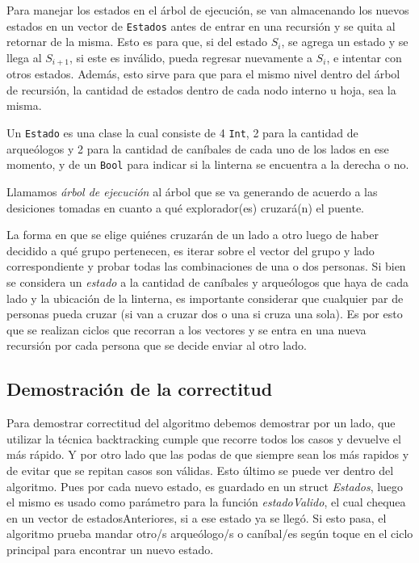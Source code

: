             Para manejar los estados en el árbol de ejecución, se van almacenando los nuevos estados en un vector de \texttt{Estados} antes de entrar en una recursión y se quita al retornar de la misma. Esto es para que, si del estado $S_{i}$, se agrega un estado y se llega al $S_{i+1}$, si este es inválido, pueda regresar nuevamente a $S_{i}$, e intentar con otros estados. Además, esto sirve para que para el mismo nivel dentro del árbol de recursión, la cantidad de estados dentro de cada nodo interno u hoja, sea la misma.

            Un \texttt{Estado} es una clase la cual consiste de 4 \texttt{Int}, 2 para la cantidad de arqueólogos y 2 para la cantidad de caníbales de cada uno de los lados en ese momento, y de un \texttt{Bool} para indicar si la linterna se encuentra a la derecha o no.

            Llamamos \emph{árbol de ejecución} al árbol que se va generando de acuerdo a las desiciones tomadas en cuanto a qué explorador(es) cruzará(n) el puente.

            La forma en que se elige quiénes cruzarán de un lado a otro luego de haber decidido a qué grupo pertenecen, es iterar sobre el vector del grupo y lado correspondiente y probar todas las combinaciones de una o dos personas. Si bien se considera un \emph{estado} a la cantidad de caníbales y arqueólogos que haya de cada lado y la ubicación de la linterna, es importante considerar que cualquier par de personas pueda cruzar (si van a cruzar dos o una si cruza una sola). Es por esto que se realizan ciclos que recorran a los vectores y se entra en una nueva recursión por cada persona que se decide enviar al otro lado.


    \subsection{Demostración de la correctitud}
      Para demostrar correctitud del algoritmo debemos demostrar por un lado, que utilizar la técnica backtracking cumple que recorre todos los casos y devuelve el más rápido. Y por otro lado que las podas de que siempre sean los más rapidos y de evitar que se repitan casos son válidas.
      Esto último se puede ver dentro del algoritmo. Pues por cada nuevo estado, es guardado en un struct \emph{Estados}, luego el mismo es usado como parámetro para la función \emph{estadoValido}, el cual chequea en un vector de estadosAnteriores, si a ese estado ya se llegó. Si esto pasa, el algoritmo prueba mandar otro/s arqueólogo/s o caníbal/es según toque en el ciclo principal para encontrar un nuevo estado.\par

